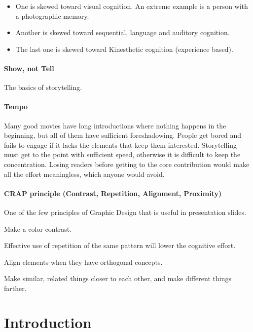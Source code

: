\begin{itemize}
 \item One is skewed toward visual cognition. An extreme example is a person with a photographic memory.
 \item Another is skewed toward sequential, language and auditory cognition.
 \item The last one is skewed toward Kinesthetic cognition (experience based).
\end{itemize}

\paragraph{Show, not Tell}

The basics of storytelling.

\paragraph{Tempo}

Many good movies have long introductions where nothing happens in the beginning, but all of them have sufficient foreshadowing.
People get bored and fails to engage if it lacks the elements that keep them interested.
Storytelling must get to the point with sufficient speed, otherwise it is difficult to keep the concentration.
Losing readers before getting to the core contribution would make all the effort meaningless, which anyone would avoid.

\paragraph{CRAP principle (Contrast, Repetition, Alignment, Proximity)}

One of the few principles of Graphic Design that is useful in presentation slides.

Make a color contrast.

Effective use of repetition of the same pattern
will lower the cognitive effort.

Align elements when they have orthogonal concepts.

Make similar, related things closer to each other,
and make different things farther.





\section{Introduction}

